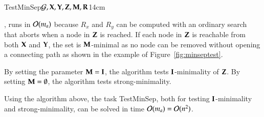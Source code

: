 \begin{algo}{TestMinSep}{${\cal G}, {\bf X}, {\bf Y}, {\bf Z}, {\bf M}, {\bf R}$}{\label{algo:isminimalsepmoral}}{14cm}

 \EndIf
{} 	{}\EndIf
{}
 \EndIf
{}
 \EndIf
{}
\end{algo}
\begin{analal}, 
runs in  ${\cal O}(m_{a})$ 
because $R_x$ and $R_y$ can be computed 
with an ordinary search that 
aborts when a node in ${\bf Z}$ is reached.
If each node in ${\bf Z}$ is reachable from both ${\bf X}$ and ${\bf Y}$, the set is $ {\bf M}$-minimal as no node can be removed without opening a connecting path as shown in the example of Figure~\ref{fig:minseptest}.

By setting the parameter $ {\bf M} = {\bf I}$, the algorithm tests ${\bf I}$-minimality of ${\bf Z}$. 
By setting $ {\bf M} = \emptyset $, the algorithm tests  strong-minimality.
\end{analal}
\begin{proposition}\label{prop:TestMinSep}
Using the algorithm above, the task 
{\sc TestMinSep}, both for testing ${\bf I}$-minimality  and strong-minimality,  can be solved in time ${\cal O}(m_{a}) = {\cal O}(n^2)$.
\end{proposition}

